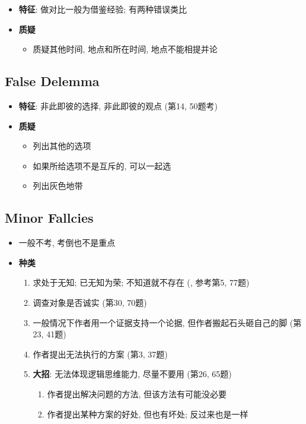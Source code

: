     \begin{itemize}
      \item \textbf{特征}: 做对比一般为借鉴经验; 有两种错误类比
      \item \textbf{质疑}
      \begin{itemize}
        \item 质疑其他时间, 地点和所在时间, 地点不能相提并论
      \end{itemize}
    \end{itemize}

  \subsection{False Delemma}

    \begin{itemize}
      \item \textbf{特征}: 非此即彼的选择, 非此即彼的观点 (第14, 50题考)
      \item \textbf{质疑}
      \begin{itemize}
        \item 列出其他的选项
        \item 如果所给选项不是互斥的, 可以一起选
        \item 列出灰色地带
      \end{itemize}
    \end{itemize}

  \subsection{Minor Fallcies}

    \begin{itemize}
      \item 一般不考, 考倒也不是重点
      \item \textbf{种类}
      \begin{enumerate}
        \item 求处于无知; 已无知为荣; 不知道就不存在
        (, 参考第5, 77题)
        \item 调查对象是否诚实 (第30, 70题)
        \item 一般情况下作者用一个证据支持一个论据, 但作者搬起石头砸自己的脚 (第23, 41题)
        \item 作者提出无法执行的方案 (第3, 37题)
        \item \textbf{大招}: 无法体现逻辑思维能力, 尽量不要用 (第26, 65题)
        \begin{enumerate}
          \item 作者提出解决问题的方法, 但该方法有可能没必要
          \item 作者提出某种方案的好处, 但也有坏处; 反过来也是一样
        \end{enumerate}
      \end{enumerate}
    \end{itemize}
